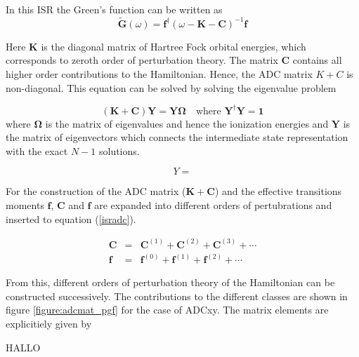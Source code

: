 In this \ac{ISR} the Green's function can be written as
\begin{equation}\label{isradc}
\mathbf{\tilde{G}}(\omega) = \mathbf{f}^\dagger(\omega-\mathbf{K}-\mathbf{C})^{-1}\mathbf{f}
\end{equation}

Here $\mathbf{K}$ is the diagonal matrix of Hartree Fock orbital energies, which
corresponds to zeroth order of perturbation theory. The matrix $\mathbf{C}$
contains all higher order contributions to the Hamiltonian.
Hence, the ADC matrix $K+C$ is non-diagonal. This equation can be solved by
solving the eigenvalue problem

\begin{equation}\label{adcewp}
(\mathbf{K}+\mathbf{C}) \mathbf{Y} = \mathbf{Y}\mathbf{\Omega} \quad\text{where } \mathbf{Y}^\dagger\mathbf{Y}=\mathbf{1}
\end{equation}
where $\mathbf{\Omega}$ is the matrix of eigenvalues and hence the ionization
energies and $\mathbf{Y}$ is the matrix of eigenvectors which connects the
intermediate state representation with the exact $N-1$ solutions.

\begin{equation}
 Y = 
\end{equation}

For the construction of the \ac{ADC} matrix ($\mathbf{K}+\mathbf{C}$) and the
effective transitions moments $\mathbf{f}$, $\mathbf{C}$ and $\mathbf{f}$
are expanded into different orders of pertubrations and inserted to equation
(\ref{isradc}).

\begin{eqnarray}
\mathbf{C} &=& \mathbf{C}^{(1)} + \mathbf{C}^{(2)} + \mathbf{C}^{(3)} + \cdots\label{stC}\\
\mathbf{f} &=& \mathbf{f}^{(0)} + \mathbf{f}^{(1)} + \mathbf{f}^{(2)} + \cdots\label{stf}
\end{eqnarray}

From this, different orders of perturbation theory of the Hamiltonian can be
constructed successively. The contributions to the different classes are shown
in figure \ref{figure:adcmat_pgf} for the case of \ac{ADC}xy.
The matrix elements are explicitiely given by

HALLO







\begin{figure}[h]
  \centering
  
  \caption{}
  \label{}
\end{figure}
